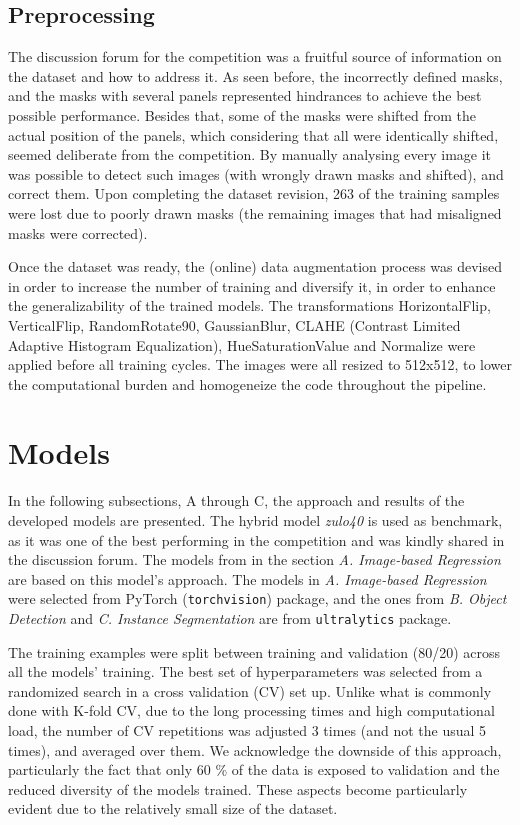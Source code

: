 \documentclass[conference]{IEEEtran}
\begin{document}
\subsection{Preprocessing}

The discussion forum for the competition was a fruitful source of information on the dataset and how to address it. As seen before, the incorrectly defined masks, and the masks with several panels represented hindrances to achieve the best possible performance. Besides that, some of the masks were shifted from the actual position of the panels, which considering that all were identically shifted, seemed deliberate from the competition. By manually analysing every image  it was possible to detect such images (with wrongly drawn masks and shifted), and correct them. Upon completing the dataset revision, 263 of the training samples were lost due to poorly drawn masks (the remaining images that had misaligned masks were corrected).

Once the dataset was ready, the (online) data augmentation process was devised in order to increase the number of training and diversify it, in order to enhance the generalizability of the trained models. The transformations HorizontalFlip, VerticalFlip, RandomRotate90, GaussianBlur, CLAHE (Contrast Limited Adaptive Histogram Equalization), HueSaturationValue and Normalize were applied before all training cycles. The images were all resized to 512x512, to lower the computational burden and homogeneize the code throughout the pipeline. 

\section{Models}

In the following subsections, A through C, the approach and results of the developed models are presented. The hybrid model \textit{zulo40} is used as benchmark, as it was one of the best performing in the competition and was kindly shared in the discussion forum. The models from in the section \textit{A. Image-based Regression} are based on this model's approach. The models in \textit{A. Image-based Regression} were selected from PyTorch (\texttt{torchvision}) package, and the ones from \textit{B. Object Detection} and \textit{C. Instance Segmentation} are from \texttt{ultralytics} package.

The training examples were split between training and validation (80/20) across all the models' training. The best set of hyperparameters was selected from a randomized search in a cross validation (CV) set up. Unlike what is commonly done with K-fold CV, due to the long processing times and high computational load, the number of CV repetitions was adjusted 3 times (and not the usual 5 times), and averaged over them. We acknowledge the downside of this approach, particularly the fact that only 60 \% of the data is exposed to validation and the reduced diversity of the models trained. These aspects become particularly evident due to the relatively small size of the dataset.
\end{document}
